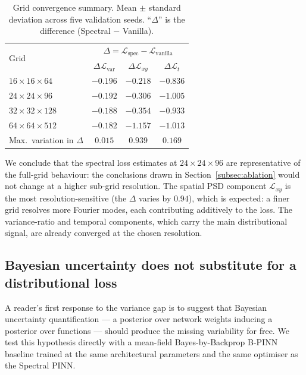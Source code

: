 \documentclass[review,12pt]{elsarticle}
\begin{document}
\begin{table}[h]
\centering
\caption{Grid convergence summary. Mean $\pm$ standard deviation
across five validation seeds. ``$\Delta$'' is the difference
(Spectral $-$ Vanilla).}
\label{tab:grid-convergence}
\begin{tabular}{l c c c}
\toprule
\multirow{2}{*}{Grid} & \multicolumn{3}{c}{$\Delta = \mathcal{L}_{\text{spec}} - \mathcal{L}_{\text{vanilla}}$} \\
& $\Delta\mathcal{L}_{\text{var}}$ & $\Delta\mathcal{L}_{xy}$ & $\Delta\mathcal{L}_{t}$ \\
\midrule
$16\times 16\times 64$  & $-0.196$ & $-0.218$ & $-0.836$ \\
$24\times 24\times 96$  & $-0.192$ & $-0.306$ & $-1.005$ \\
$32\times 32\times 128$ & $-0.188$ & $-0.354$ & $-0.933$ \\
$64\times 64\times 512$ & $-0.182$ & $-1.157$ & $-1.013$ \\
\midrule
Max.\ variation in $\Delta$ & $0.015$ & $0.939$ & $0.169$ \\
\bottomrule
\end{tabular}
\end{table}

We conclude that the spectral loss estimates at $24 \times 24 \times
96$ are representative of the full-grid behaviour: the conclusions
drawn in Section~\ref{subsec:ablation}
would not change at a higher sub-grid resolution. The spatial PSD
component $\mathcal{L}_{xy}$ is the most resolution-sensitive (the
$\Delta$ varies by $0.94$), which is expected: a finer grid resolves
more Fourier modes, each contributing additively to the loss. The
variance-ratio and temporal components, which carry the main
distributional signal, are already converged at the chosen resolution.
\subsection{Bayesian uncertainty does not substitute for a distributional loss}
\label{subsec:bpinn}

A reader's first response to the variance gap is to suggest that
Bayesian uncertainty quantification --- a posterior over network
weights inducing a posterior over functions --- should produce
the missing variability for free. We test this hypothesis
directly with a mean-field Bayes-by-Backprop B-PINN baseline
trained at the same architectural parameters and the same
optimiser as the Spectral PINN.
\end{document}
